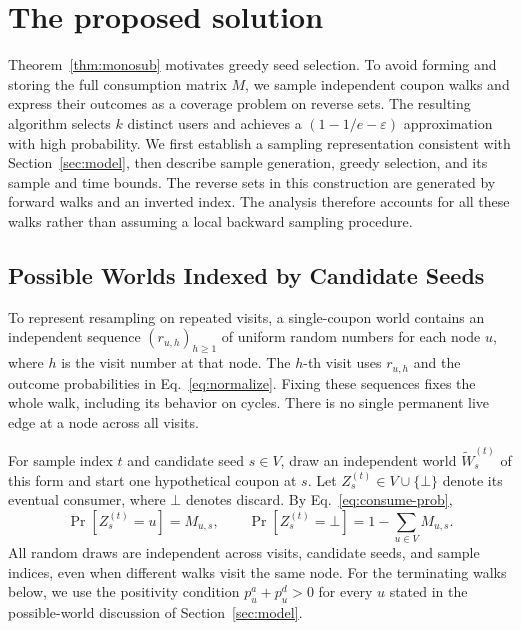 \documentclass[sigconf]{acmart}
\begin{document}
\section{The proposed solution}
\label{sec:algo}

Theorem~\ref{thm:monosub} motivates greedy seed selection. To avoid
forming and storing the full consumption matrix $M$, we
sample independent coupon walks and express their outcomes as a
coverage problem on reverse sets. The resulting algorithm selects
$k$ distinct users and achieves a $(1-1/e-\varepsilon)$ approximation
with high probability. We first establish a sampling representation
consistent with Section~\ref{sec:model}, then describe sample
generation, greedy selection, and its sample and time bounds.
The reverse sets in this construction are generated by forward walks
and an inverted index. The analysis therefore accounts for all these
walks rather than assuming a local backward sampling procedure.

\subsection{Possible Worlds Indexed by Candidate Seeds}
\label{sec:source-worlds}

To represent resampling on repeated visits, a single-coupon world
contains an independent sequence $(r_{u,h})_{h\geq1}$ of uniform
random numbers for each node $u$, where $h$ is the visit number at
that node. The $h$-th visit uses $r_{u,h}$ and the outcome probabilities
in Eq.~\eqref{eq:normalize}. Fixing these sequences fixes the whole
walk, including its behavior on cycles. There is no single permanent
live edge at a node across all visits.

For sample index $t$ and candidate seed $s\in V$, draw an independent
world $\widetilde W_s^{(t)}$ of this form and start one hypothetical
coupon at $s$. Let $Z_s^{(t)}\in V\cup\{\bot\}$ denote its eventual
consumer, where $\bot$ denotes discard. By Eq.~\eqref{eq:consume-prob},
\begin{equation}
\label{eq:endpoint-law}
  \Pr[Z_s^{(t)}=u]=M_{u,s},\qquad
  \Pr[Z_s^{(t)}=\bot]=1-\sum_{u\in V}M_{u,s}.
\end{equation}
All random draws are independent across visits, candidate seeds, and
sample indices, even when different walks visit the same node.
For the terminating walks below, we use the positivity condition
$p_u^a+p_u^d>0$ for every $u$ stated in the possible-world discussion
of Section~\ref{sec:model}.
\end{document}
